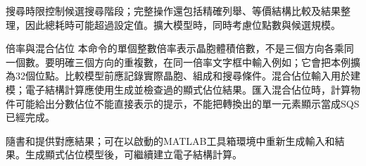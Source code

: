 搜尋時限控制候選搜尋階段；完整操作還包括精確列舉、等價結構比較及結果整理，因此總耗時可能超過設定值。擴大模型時，同時考慮位點數與候選規模。

\begin{notebox}{倍率與混合佔位}
本命令的單個整數倍率表示晶胞體積倍數，不是三個方向各乘同一個數。要明確三個方向的重複數，在同一倍率文字框中輸入例如；它會把本例擴為32個位點。比較模型前應記錄實際晶胞、組成和搜尋條件。混合佔位輸入用於建模；電子結構計算應使用生成並檢查過的顯式佔位結果。匯入混合佔位時，計算物件可能給出分數佔位不能直接表示的提示，不能把轉換出的單一元素顯示當成SQS已經完成。
\end{notebox}

隨書和提供對應結果；可在以啟動的MATLAB\regmark{}工具箱環境中重新生成輸入和結果。生成顯式佔位模型後，可繼續建立電子結構計算。

